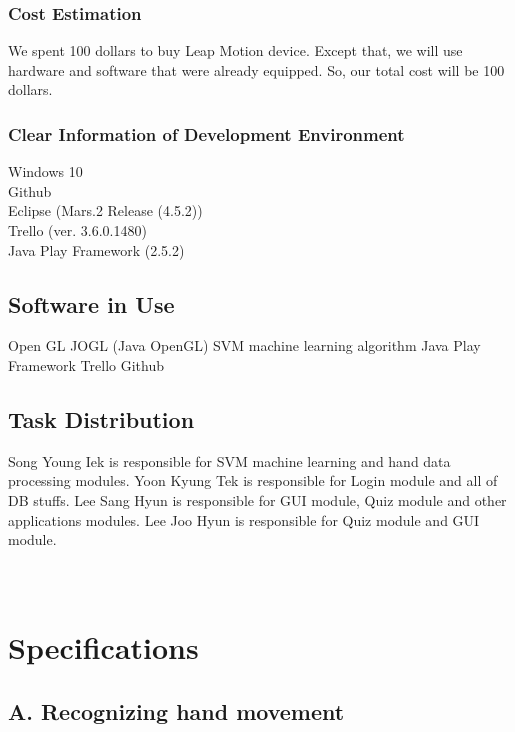 \documentclass[10pt,journal,compsoc]{IEEEtran}
\begin{document}
\subsubsection{Cost Estimation}

We spent 100 dollars to buy Leap Motion device. Except that, we will use hardware and software that were already equipped. So, our total cost will be 100 dollars.

\subsubsection{Clear Information of Development Environment}

Windows 10
\\Github
\\Eclipse (Mars.2 Release (4.5.2))
\\Trello (ver. 3.6.0.1480)
\\Java Play Framework (2.5.2)

\subsection{Software in Use}
Open GL
JOGL (Java OpenGL)
SVM machine learning algorithm
Java Play Framework
Trello
Github


\subsection{Task Distribution}
Song Young Iek is responsible for SVM machine learning and hand data processing modules.
Yoon Kyung Tek is responsible for Login module and all of DB stuffs.
Lee Sang Hyun is responsible for GUI module, Quiz module and other applications modules.
Lee Joo Hyun is responsible for Quiz module and GUI module.\\\\\\

\ifCLASSOPTIONcompsoc
{}
\else
\section{Specifications}
\label{sec:Specifications}
\fi
\subsection{A. Recognizing hand movement}
\end{document}
